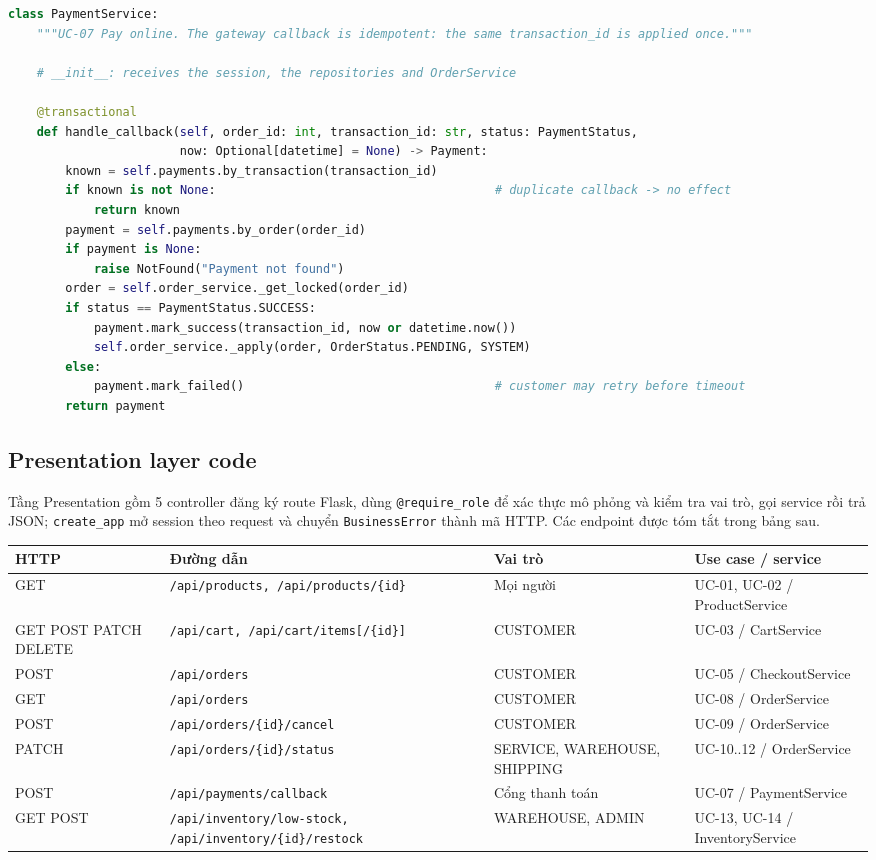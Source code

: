 \documentclass[12pt,a4paper,oneside]{report}
\begin{document}
\begin{lstlisting}[language=Python,caption={PaymentService: callback thanh toán idempotent},label={lst:payservice}]
class PaymentService:
    """UC-07 Pay online. The gateway callback is idempotent: the same transaction_id is applied once."""

    # __init__: receives the session, the repositories and OrderService

    @transactional
    def handle_callback(self, order_id: int, transaction_id: str, status: PaymentStatus,
                        now: Optional[datetime] = None) -> Payment:
        known = self.payments.by_transaction(transaction_id)
        if known is not None:                                       # duplicate callback -> no effect
            return known
        payment = self.payments.by_order(order_id)
        if payment is None:
            raise NotFound("Payment not found")
        order = self.order_service._get_locked(order_id)
        if status == PaymentStatus.SUCCESS:
            payment.mark_success(transaction_id, now or datetime.now())
            self.order_service._apply(order, OrderStatus.PENDING, SYSTEM)
        else:
            payment.mark_failed()                                   # customer may retry before timeout
        return payment
\end{lstlisting}

\subsection{Presentation layer code}
Tầng Presentation gồm 5 controller đăng ký route Flask, dùng \texttt{@require\_role} để xác thực mô phỏng và kiểm tra vai trò, gọi service rồi trả JSON; \texttt{create\_app} mở session theo request và chuyển \texttt{BusinessError} thành mã HTTP. Các endpoint được tóm tắt trong bảng sau.
\begin{longtable}{@{}p{1.6cm}p{5.6cm}p{2.8cm}p{5.2cm}@{}}\toprule \textbf{HTTP} & \textbf{Đường dẫn} & \textbf{Vai trò} & \textbf{Use case / service}\\\midrule\endhead
GET & \texttt{/api/products, /api/products/\{id\}} & Mọi người & UC-01, UC-02 / ProductService\\\midrule
GET POST PATCH DELETE & \texttt{/api/cart, /api/cart/items[/\{id\}]} & CUSTOMER & UC-03 / CartService\\\midrule
POST & \texttt{/api/orders} & CUSTOMER & UC-05 / CheckoutService\\\midrule
GET & \texttt{/api/orders} & CUSTOMER & UC-08 / OrderService\\\midrule
POST & \texttt{/api/orders/\{id\}/cancel} & CUSTOMER & UC-09 / OrderService\\\midrule
PATCH & \texttt{/api/orders/\{id\}/status} & SERVICE, WAREHOUSE, SHIPPING & UC-10..12 / OrderService\\\midrule
POST & \texttt{/api/payments/callback} & Cổng thanh toán & UC-07 / PaymentService\\\midrule
GET POST & \texttt{/api/inventory/low-stock, /api/inventory/\{id\}/restock} & WAREHOUSE, ADMIN & UC-13, UC-14 / InventoryService\\\midrule
\bottomrule\end{longtable}
\end{document}
